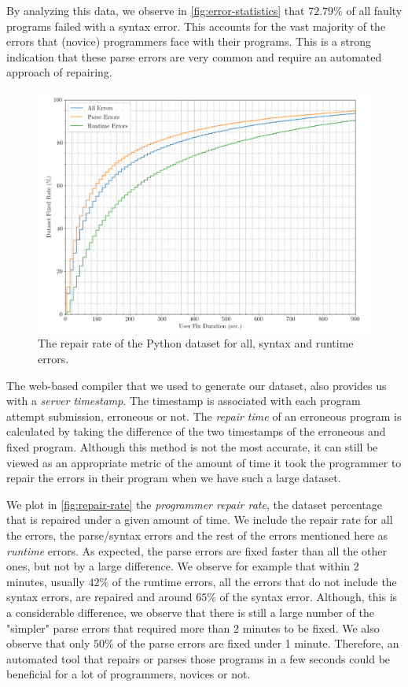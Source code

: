 By analyzing this data, we observe in \autoref{fig:error-statistics} that $72.79
\% $ of all faulty programs failed with a syntax error. This accounts for the
vast majority of the errors that (novice) programmers face with their programs.
This is a strong indication that these parse errors are very common and require
an automated approach of repairing.

\begin{figure}[h]
  \centering
  \includegraphics[width=0.9\linewidth]{repair-rate-all-parse.png}
  \caption{The repair rate of the Python dataset for all, syntax and runtime
  errors.}
  \label{fig:repair-rate}
\end{figure}

 The web-based compiler that we used to generate our
dataset, also provides us with a \emph{server timestamp}. The timestamp is
associated with each program attempt submission, erroneous or not. The
\emph{repair time} of an erroneous program is calculated by taking the
difference of the two timestamps of the erroneous and fixed program. Although
this method is not the most accurate, it can still be viewed as an appropriate
metric of the amount of time it took the programmer to repair the errors in
their program when we have such a large dataset.

We plot in \autoref{fig:repair-rate} the \emph{programmer repair rate}, \ie the
dataset percentage that is repaired under a given amount of time. We include the
repair rate for all the errors, the parse/syntax errors and the rest of the
errors mentioned here as \emph{runtime} errors. As expected, the parse errors
are fixed faster than all the other ones, but not by a large difference. We
observe for example that within 2 minutes, usually $42 \%$ of the runtime
errors, \ie all the errors that do not include the syntax errors, are repaired
and around $65 \%$ of the syntax error. Although, this is a considerable
difference, we observe that there is still a large number of the "simpler" parse
errors that required more than 2 minutes to be fixed. We also observe that only
$50 \%$ of the parse errors are fixed under 1 minute. Therefore, an automated
tool that repairs or parses those programs in a few seconds could be beneficial
for a lot of programmers, novices or not.

